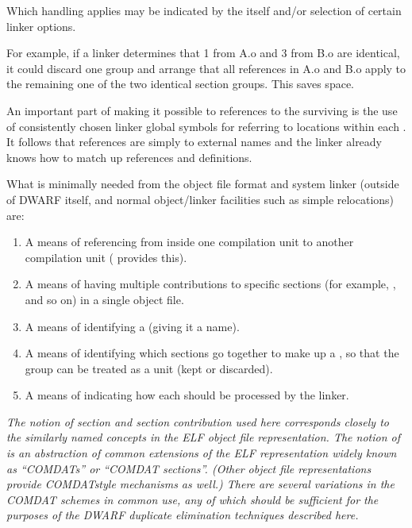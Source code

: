 Which handling applies may be indicated by the 
itself and/or selection of certain linker options.

For example, if a linker determines that 
 1
from A.o and 
 3 from B.o are identical, it could
discard one group and arrange that all references in A.o and
B.o apply to the remaining one of the two identical section
groups. This saves space.

An important part of making it possible to 
references to the surviving 
 is the use of
consistently chosen linker global symbols for referring to
locations within each 
.
It follows that references
are simply to external names and the linker already knows
how to match up references and definitions.

What is minimally needed from the object file format and system
linker (outside of DWARF itself, and normal object/linker
facilities such as simple relocations) are:
\begin{enumerate}[1. ]

\item A means of referencing from inside one 
compilation unit to another 
 compilation unit
( provides this).

\item A means of having multiple contributions to specific sections
(for example, , and so on) in a single object file.

\item  A means of identifying a  (giving it a name).

\item A means of identifying which sections go together to make
up a , 
so that the group can be treated as a unit
(kept or discarded).

\item  A means of indicating how each  should be
processed by the linker.

\end{enumerate}

\textit{The notion of section and section contribution used here
corresponds closely to the similarly named concepts in the
ELF object file representation. 
The notion of  is
an abstraction of common extensions of the ELF representation
widely known as ``COMDATs'' or ``COMDAT sections''. (Other
object file representations provide COMDAT\dash style mechanisms as
well.) There are several variations in the COMDAT schemes in
common use, any of which should be sufficient for the purposes
of the 
DWARF duplicate elimination techniques described here.}

